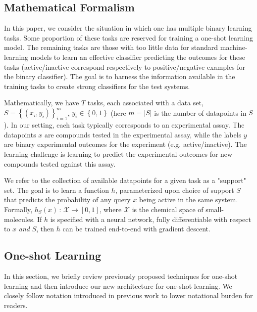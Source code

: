 \documentclass[journal=jacsat,manuscript=article]{achemso}
\begin{document}
\subsection{Mathematical Formalism}

In this paper, we consider the situation in which one has multiple binary learning tasks. Some proportion of these tasks are reserved for training a one-shot learning model. The remaining tasks are those with too little data for standard machine-learning models to learn an effective classifier predicting the outcomes for these tasks (active/inactive correspond respectively to positive/negative examples for the binary classifier). The goal is to harness the information available in the training tasks to create strong classifiers for the test systems. 


Mathematically, we have $T$ tasks, each associated with a data set, $S=\left\{\left(x_i,y_i\right)\right\}_{i=1}^{m}$, $y_i\in\left\{0,1\right\}$ (here $m = |S|$ is the number of datapoints in $S$). In our setting, each task typically corresponds to an experimental assay. The datapoints $x$ are compounds tested in the experimental assay, while the labels $y$ are binary experimental outcomes for the experiment (e.g. active/inactive). The learning challenge is learning to predict the experimental outcomes for new compounds tested against this assay.

We refer to the collection of available datapoints for a given task as a "support" set. The goal is to learn a function $h$, parameterized upon choice of support $S$ that predicts the probability of any query $x$ being active in the same system. Formally, $h_S(x)\,:\,\mathcal{X}\rightarrow\left[0,1\right]$, where $\mathcal{X}$ is the chemical space of small-molecules. If $h$ is specified with a neural network, fully differentiable with respect to $x$ \emph{and} $S$, then $h$ can be trained end-to-end with gradient descent.


\subsection{One-shot Learning}
In this section, we briefly review previously proposed techniques for one-shot learning and then introduce our new architecture for one-shot learning. We closely follow notation introduced in previous work \cite{vinyals2016matching} to lower notational burden for readers.
\end{document}
